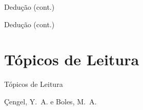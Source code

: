     \begin{frame}{Dedução (cont.)}\vspace*{-1em}
    \end{frame}

    \begin{frame}{Dedução (cont.)}\vspace*{-1em}
    \end{frame}

\section{Tópicos de Leitura}

    \begin{frame}[allowframebreaks]{Tópicos de Leitura}
        \begin{thebibliography}{Çengel, Y.~A., 2013}
                Çengel, Y.~A. e Boles, M.~A.
        \end{thebibliography}
    \end{frame}




